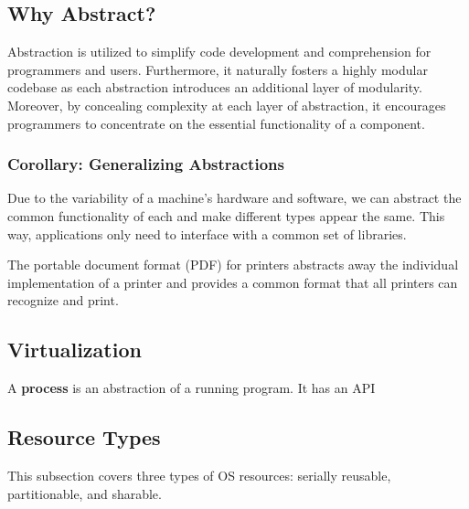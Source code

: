 \documentclass{article}
\begin{document}
\subsection{Why Abstract?}
Abstraction is utilized to simplify code development and comprehension for programmers and
users. Furthermore, it naturally fosters a highly modular codebase as each abstraction introduces an
additional layer of modularity. Moreover, by concealing complexity at each layer of abstraction, it
encourages programmers to concentrate on the essential functionality of a component. 


\subsubsection{Corollary: Generalizing Abstractions}
Due to the variability of a machine's hardware and software, we can abstract the common
functionality of each and make different types appear the same. This way, applications only need to
interface with a common set of libraries. 

\begin{tcolorbox}[colback=blue!5!white,colframe=black!75!blue,title=Example: Printing Press]
  The portable document format (PDF) for printers abstracts away the individual implementation of a
  printer and provides a common format that all printers can recognize and print.
\end{tcolorbox}

\begin{tcolorbox}[colback=red!5!white,colframe=red!75!red,title=WIP]
 \subsection{Virtualization}
\begin{tcolorbox}[colback=black!5!white,colframe=black!75!black,title=\textit{4) The Abstraction: The Process}]
  \begin{tcolorbox}[title=Definition: Process]
    A \textbf{process} is an abstraction of a running program. It has an API 
  \end{tcolorbox}
\end{tcolorbox}
\end{tcolorbox}



\subsection{Resource Types}
This subsection covers three types of OS resources: serially reusable, partitionable, and
sharable.
\end{document}
